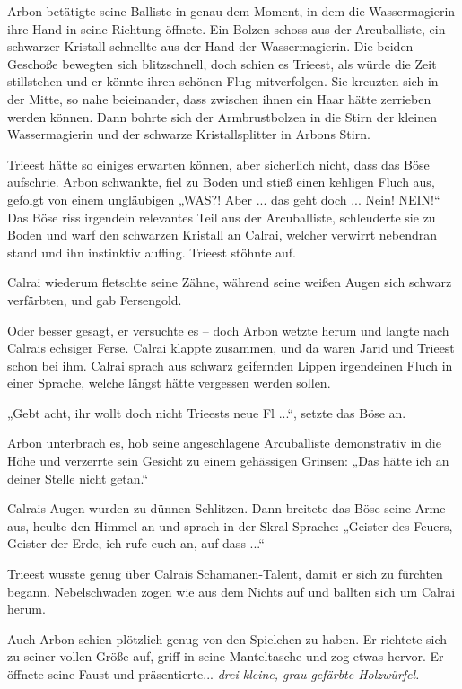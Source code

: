Arbon betätigte seine Balliste in genau dem Moment, in dem die Wassermagierin ihre Hand in seine Richtung öffnete. Ein Bolzen schoss aus der Arcuballiste, ein schwarzer Kristall schnellte aus der Hand der Wassermagierin. Die beiden Geschoße bewegten sich blitzschnell, doch schien es Trieest, als würde die Zeit stillstehen und er könnte ihren schönen Flug mitverfolgen. Sie kreuzten sich in der Mitte, so nahe beieinander, dass zwischen ihnen ein Haar hätte zerrieben werden können. Dann bohrte sich der Armbrustbolzen in die Stirn der kleinen Wassermagierin und der schwarze Kristallsplitter in Arbons Stirn.

Trieest hätte so einiges erwarten können, aber sicherlich nicht, dass das Böse aufschrie. Arbon schwankte, fiel zu Boden und stieß einen kehligen Fluch aus, gefolgt von einem ungläubigen „WAS?! Aber ... das geht doch ... Nein! NEIN!“ Das Böse riss irgendein relevantes Teil aus der Arcuballiste, schleuderte sie zu Boden und warf den schwarzen Kristall an Calrai, welcher verwirrt nebendran stand und ihn instinktiv auffing. Trieest stöhnte auf.

Calrai wiederum fletschte seine Zähne, während seine weißen Augen sich schwarz verfärbten, und gab Fersengold.

Oder besser gesagt, er versuchte es – doch Arbon wetzte herum und langte nach Calrais echsiger Ferse. Calrai klappte zusammen, und da waren Jarid und Trieest schon bei ihm. Calrai sprach aus schwarz geifernden Lippen irgendeinen Fluch in einer Sprache, welche längst hätte vergessen werden sollen.

„Gebt acht, ihr wollt doch nicht Trieests neue Fl ...“, setzte das Böse an.

Arbon unterbrach es, hob seine angeschlagene Arcuballiste demonstrativ in die Höhe und verzerrte sein Gesicht zu einem gehässigen Grinsen: „Das hätte ich an deiner Stelle nicht getan.“

Calrais Augen wurden zu dünnen Schlitzen. Dann breitete das Böse seine Arme aus, heulte den Himmel an und sprach in der Skral-Sprache: „Geister des Feuers, Geister der Erde, ich rufe euch an, auf dass ...“

Trieest wusste genug über Calrais Schamanen-Talent, damit er sich zu fürchten begann. Nebelschwaden zogen wie aus dem Nichts auf und ballten sich um Calrai herum.

Auch Arbon schien plötzlich genug von den Spielchen zu haben. Er richtete sich zu seiner vollen Größe auf, griff in seine Manteltasche und zog etwas hervor. Er öffnete seine Faust und präsentierte... \textit{drei kleine, grau gefärbte Holzwürfel.}\bigskip



